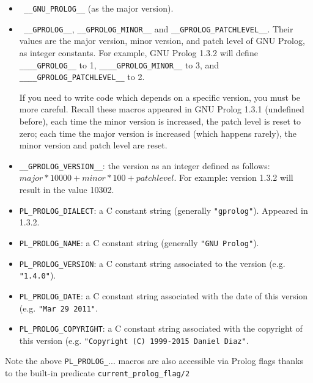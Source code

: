 \begin{itemize}

\item \texttt{ \_\_GNU\_PROLOG\_\_} (as the major version).

\item \texttt{ \_\_GPROLOG\_\_}, \texttt{\_\_GPROLOG\_MINOR\_\_} and
  \texttt{\_\_GPROLOG\_PATCHLEVEL\_\_}. Their values are the major version,
  minor version, and patch level of GNU Prolog, as integer constants. For
  example, GNU Prolog 1.3.2 will define \texttt{\_\_\_\_GPROLOG\_\_} to 1,
  \texttt{\_\_\_\_GPROLOG\_MINOR\_\_} to 3, and
  \texttt{\_\_\_\_GPROLOG\_PATCHLEVEL\_\_} to 2.

  If you need to write code which depends on a specific version, you must be
  more careful. Recall these macros appeared in GNU Prolog 1.3.1 (undefined
  before), each time the minor version is increased, the patch level is reset
  to zero; each time the major version is increased (which happens rarely),
  the minor version and patch level are reset.

\item \texttt{\_\_GPROLOG\_VERSION\_\_}: the version as an integer defined as
  follows: $major * 10000 + minor * 100 + patch level$. For example: version
  1.3.2 will result in the value 10302.

\item \texttt{PL\_PROLOG\_DIALECT}: a C constant string (generally
  \texttt{"gprolog"}). Appeared in 1.3.2.

\item \texttt{PL\_PROLOG\_NAME}: a C constant string (generally
  \texttt{"GNU Prolog"}).

\item \texttt{PL\_PROLOG\_VERSION}: a C constant string associated to the
  version (e.g. \texttt{"1.4.0"}).

\item \texttt{PL\_PROLOG\_DATE}: a C constant string associated with the date
  of this version (e.g. \texttt{"Mar 29 2011"}.

\item \texttt{PL\_PROLOG\_COPYRIGHT}: a C constant string associated with the
  copyright of this version (e.g. \texttt{"Copyright (C) 1999-2015 Daniel Diaz"}.

\end{itemize}

Note the above \texttt{PL\_PROLOG\_}... macros are also accessible via Prolog
flags thanks to the built-in predicate \texttt{current\_prolog\_flag/2}


